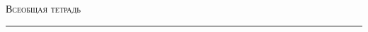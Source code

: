 \begin{center}
    \LARGE \textsc{Всеобщая тетрадь}
\end{center}

\hrule

\phantom{42}

\thispagestyle{empty}
\tableofcontents
\newpage